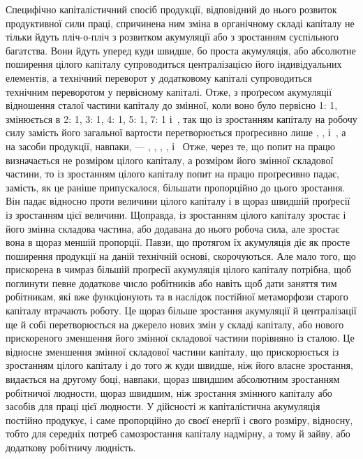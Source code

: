 Специфічно капіталістичний спосіб продукції, відповідний
до нього розвиток продуктивної сили праці, спричинена ним
зміна в органічному складі капіталу не тільки йдуть пліч-о-пліч
з розвитком акумуляції або з зростанням суспільного багатства.
Вони йдуть уперед куди швидше, бо проста акумуляція,
або абсолютне поширення цілого капіталу супроводиться централізацією
його індивідуальних елементів, а технічний переворот
у додатковому капіталі супроводиться технічним переворотом
у первісному капіталі. Отже, з проґресом акумуляції
відношення сталої частини капіталу до змінної, коли воно було
первісно 1: 1, змінюється в 2: 1, 3: 1, 4: 1, 5: 1, 7: 1 і~,
так що із зростанням капіталу на робочу силу замість  його
загальної вартости перетворюється проґресивно лише , ,
   і~, а на засоби продукції, навпаки, — , , ,
,  і~ Отже, через те, що попит на працю визначається не
розміром цілого капіталу, а розміром його змінної складової
частини, то із зростанням цілого капіталу попит на працю проґресивно
падає, замість, як це раніше припускалося, більшати
пропорційно до цього зростання. Він падає відносно проти величини
цілого капіталу і в щораз швидшій проґресії із зростанням
цієї величини. Щоправда, із зростанням цілого капіталу зростає
і його змінна складова частина, або додавана до нього робоча
сила, але зростає вона в щораз меншій пропорції. Павзи, що протягом
їх акумуляція діє як просте поширення продукції на
даній технічній основі, скорочуються. Але мало того, що прискорена
в чимраз більшій проґресії акумуляція цілого капіталу
потрібна, щоб поглинути певне додаткове число робітників або
навіть щоб дати заняття тим робітникам, які вже функціонують
та в наслідок постійної метаморфози старого капіталу втрачають
роботу. Це щораз більше зростання акумуляції й централізації
ще й собі перетворюється на джерело нових змін у складі капіталу,
або нового прискореного зменшення його змінної складової
частини порівняно із сталою. Це відносне зменшення змінної
складової частини капіталу, що прискорюється із зростанням
цілого капіталу і до того ж куди швидше, ніж його власне зростання,
видається на другому боці, навпаки, щораз швидшим
абсолютним зростанням робітничої людности, щораз швидшим,
ніж зростання змінного капіталу або засобів для праці цієї людности.
У дійсності ж капіталістична акумуляція постійно продукує,
і саме пропорційно до своєї енерґії і свого розміру, відносну,
тобто для середніх потреб самозростання капіталу надмірну,
а тому й зайву, або додаткову робітничу людність.

